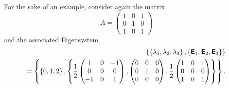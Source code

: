 {\color{blue}
\bexample
For the sake of an example, consider again the
{matrix}
\begin{equation}
A=
\begin{pmatrix}
1&0&1\\
0&1&0\\
1&0&1
\end{pmatrix}
\end{equation}
and the associated Eigensystem
\begin{equation}
\begin{split}
\left\{
\left\{  \lambda_1,\lambda_2,\lambda_3 \right\},\left\{ \textsf{\textbf{E}}_1,\textsf{\textbf{E}}_2,\textsf{\textbf{E}}_3\right\} \right\}\\
=
\left\{
\left\{  0,1,2 \right\},
\left\{
\frac{1}{2}
\begin{pmatrix}
1&0&-1\\
0&0&0\\
-1&0&1
\end{pmatrix}
,
\begin{pmatrix}
0&0&0\\
0&1&0\\
0&0&0
\end{pmatrix}
,
\frac{1}{2}
\begin{pmatrix}
1&0&1\\
0&0&0\\
1&0&1
\end{pmatrix}
\right\}
\right\} .
\end{split}
\end{equation}

}
